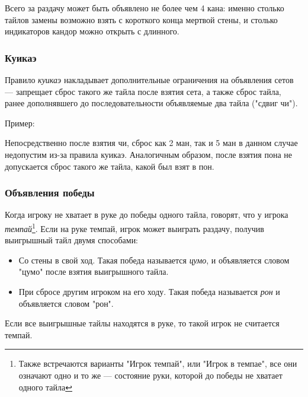 Всего за раздачу может быть объявлено не более чем 4 кана: именно столько тайлов замены возможно взять с короткого конца мертвой стены, и столько индикаторов кандор можно открыть с длинного.

\subsubsection{Куикаэ}

Правило \textit{куикаэ} накладывает дополнительные ограничения на объявления сетов --- запрещает сброс такого же тайла после взятия сета, а также сброс тайла, ранее дополнявшего до последовательности объявляемые два тайла ("сдвиг чи").

\begin{example}

Пример:
\vspace{5mm}

 \hfill {}
\vspace{5mm}

Непосредственно после взятия чи, сброс как 2 ман, так и 5 ман в данном случае недопустим из-за правила куикаэ. Аналогичным образом, после взятия пона не допускается сброс такого же тайла, какой был взят в пон.

\end{example}

\subsubsection{Объявления победы}

Когда игроку не хватает в руке до победы одного тайла, говорят, что у игрока \textit{темпай}\footnote{Также встречаются варианты "Игрок темпай", или "Игрок в темпае", все они означают одно и то же --- состояние руки, которой до победы не хватает одного тайла}. Если на руке темпай, игрок может выиграть раздачу, получив выигрышный тайл двумя способами:

\begin{itemize}
	\item Со стены в свой ход. Такая победа называется \textit{цумо}, и объявляется словом "цумо" после взятия выигрышного тайла.
	\item При сбросе другим игроком на его ходу. Такая победа называется \textit{рон} и объявляется словом "рон".
\end{itemize}

Если все выигрышные тайлы находятся в руке, то такой игрок не считается темпай.

